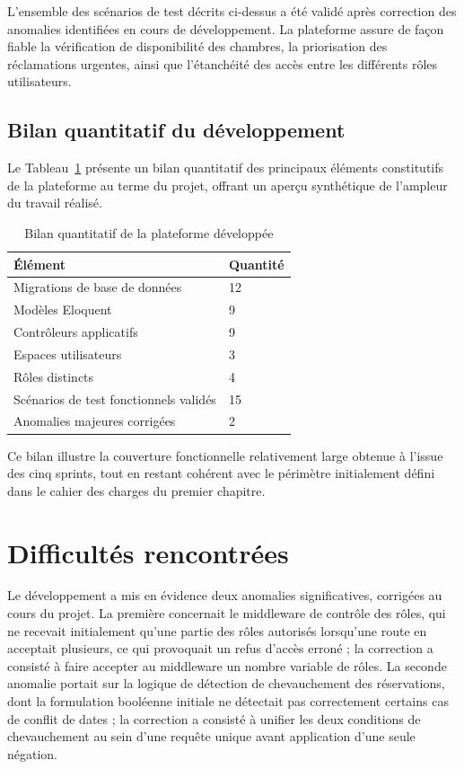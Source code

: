 \documentclass[12pt,a4paper]{report}
\begin{document}
L'ensemble des scénarios de test décrits ci-dessus a été validé après
correction des anomalies identifiées en cours de développement. La
plateforme assure de façon fiable la vérification de disponibilité des
chambres, la priorisation des réclamations urgentes, ainsi que
l'étanchéité des accès entre les différents rôles utilisateurs.

\subsection{Bilan quantitatif du développement}

Le Tableau~\ref{tab:bilan} présente un bilan quantitatif des principaux
éléments constitutifs de la plateforme au terme du projet, offrant un
aperçu synthétique de l'ampleur du travail réalisé.

\begin{table}[H]
\centering
\begin{tabular}{p{6cm} p{4cm}}
\toprule
\textbf{Élément} & \textbf{Quantité} \\
\midrule
Migrations de base de données & 12 \\
Modèles Eloquent & 9 \\
Contrôleurs applicatifs & 9 \\
Espaces utilisateurs & 3 \\
Rôles distincts & 4 \\
Scénarios de test fonctionnels validés & 15 \\
Anomalies majeures corrigées & 2 \\
\bottomrule
\end{tabular}
\caption{Bilan quantitatif de la plateforme développée}
\label{tab:bilan}
\end{table}

Ce bilan illustre la couverture fonctionnelle relativement large obtenue à
l'issue des cinq sprints, tout en restant cohérent avec le périmètre
initialement défini dans le cahier des charges du premier chapitre.

\section{Difficultés rencontrées}

Le développement a mis en évidence deux anomalies significatives,
corrigées au cours du projet. La première concernait le middleware de
contrôle des rôles, qui ne recevait initialement qu'une partie des rôles
autorisés lorsqu'une route en acceptait plusieurs, ce qui provoquait un
refus d'accès erroné ; la correction a consisté à faire accepter au
middleware un nombre variable de rôles. La seconde anomalie portait sur la
logique de détection de chevauchement des réservations, dont la
formulation booléenne initiale ne détectait pas correctement certains cas
de conflit de dates ; la correction a consisté à unifier les deux
conditions de chevauchement au sein d'une requête unique avant application
d'une seule négation.
\end{document}

